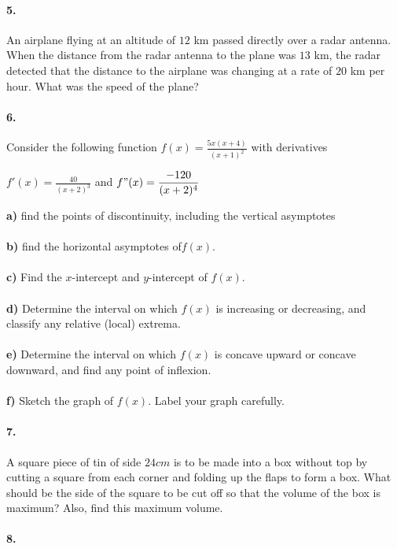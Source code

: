\documentclass[12pt]{article}
\begin{document}
	\paragraph{5.}
	An airplane flying at an altitude of $12$ km passed directly over a radar antenna. When
	the distance from the radar antenna to the plane was $13$ km, the radar detected that the
	distance to the airplane was changing at a rate of $20$ km per hour. What was the speed of
	the plane?
	
	\paragraph{6.}
	Consider the following function
		$\displaystyle f(x) = \frac{5x(x+4)}{(x+1)^2}$ with derivatives
		\begin{center}
		$\displaystyle f'(x) = \frac{40}{(x+2)^3}$ \hspace{16pt} and \hspace{16pt} $\displaystyle f"(x) = \frac{-120}{(x+2)^4}$\\
		\end{center}
		
	\textbf{a)} find the points of discontinuity, including the  vertical asymptotes\\
	\\
	\textbf{b)} find the horizontal asymptotes of$ \displaystyle f(x).$\\
	\\
	\textbf{c)} Find the $x$-intercept and $y$-intercept of $f(x)$.\\
	\\
	\textbf{d)} Determine the interval on which $f(x)$ is increasing or decreasing, and classify any relative (local) extrema.\\
	\\
	\textbf{e)} Determine the interval on which $f(x)$ is concave upward or concave downward, and find any point of inflexion.\\
	\\
	\textbf{f)} Sketch the graph of $f(x)$. Label your graph carefully.
	
	\paragraph{7.}
	A square piece of tin of side $24cm$ is to be made into a box without top by cutting a square from each corner and folding up the flaps to form a box. What should be the side of the square to be cut off so that the volume of the box is maximum? Also, find this maximum volume.

	\paragraph{8.}
\end{document}
